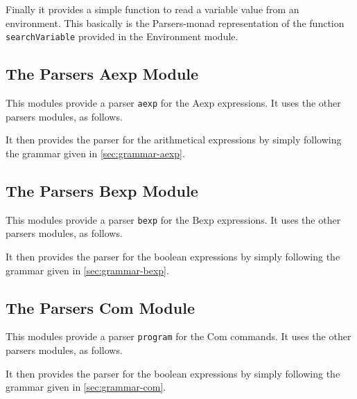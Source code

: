 \documentclass{esposito-documentation}
\begin{document}
Finally it provides a simple function to read a variable value from an
environment.  This basically is the Parsers-monad representation of the
function \lstinline|searchVariable| provided in the Environment module.



\subsection{The Parsers Aexp Module}


This modules provide a parser \lstinline|aexp| for the $\mathrm{Aexp}$
expressions. It uses the other parsers modules, as follows.



It then provides the parser for the arithmetical expressions by simply following
the grammar given in \autoref{sec:grammar-aexp}.



\subsection{The Parsers Bexp Module}


This modules provide a parser \lstinline|bexp| for the $\mathrm{Bexp}$
expressions. It uses the other parsers modules, as follows.



It then provides the parser for the boolean expressions by simply following the
grammar given in \autoref{sec:grammar-bexp}.



\subsection{The Parsers Com Module}


This modules provide a parser \lstinline|program| for the $\mathrm{Com}$
commands. It uses the other parsers modules, as follows.



It then provides the parser for the boolean expressions by simply following the
grammar given in \autoref{sec:grammar-com}.
\end{document}
